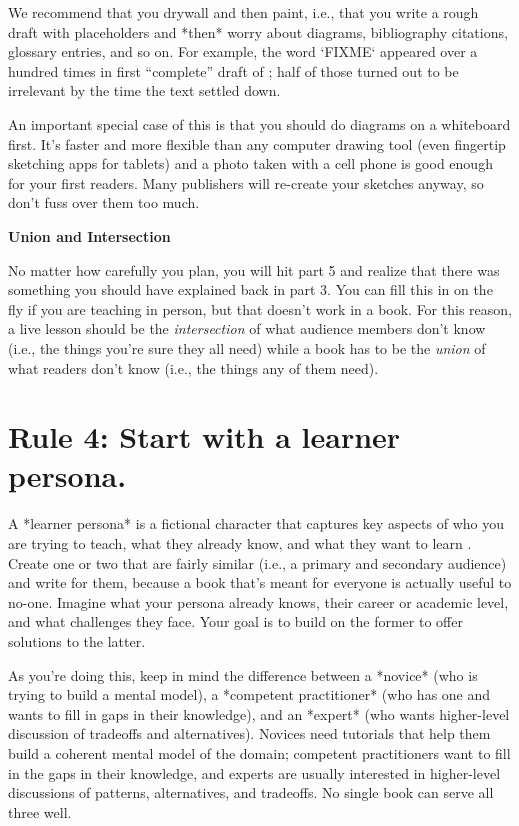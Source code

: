\documentclass[10pt,letterpaper]{article}
\begin{document}
We recommend that you drywall and then paint,
i.e.,
that you write a rough draft with placeholders
and *then* worry about diagrams, bibliography citations, glossary entries, and so on.
For example,
the word `FIXME` appeared over a hundred times in first ``complete'' draft of \cite{Wi2019};
half of those turned out to be irrelevant by the time the text settled down.

An important special case of this is that you should do diagrams on a whiteboard first.
It's faster and more flexible than any computer drawing tool
(even fingertip sketching apps for tablets)
and a photo taken with a cell phone is good enough for your first readers.
Many publishers will re-create your sketches anyway,
so don't fuss over them too much.

\begin{mdframed}
\textbf{Union and Intersection}

\noindent
No matter how carefully you plan,
you will hit part 5 and realize that
there was something you should have explained back in part 3.
You can fill this in on the fly if you are teaching in person,
but that doesn't work in a book.
For this reason,
a live lesson should be the \emph{intersection} of what audience members don't know
(i.e., the things you're sure they all need)
while a book has to be the \emph{union} of what readers don't know
(i.e., the things any of them need).
\end{mdframed}

\section*{Rule 4: Start with a learner persona.}

A *learner persona* is a fictional character that captures key aspects of
who you are trying to teach,
what they already know,
and what they want to learn \cite{Wi2019}.
Create one or two that are fairly similar (i.e., a primary and secondary audience) and write for them,
because a book that's meant for everyone is actually useful to no-one.
Imagine what your persona already knows,
their career or academic level,
and what challenges they face.
Your goal is to build on the former to offer solutions to the latter. 

As you're doing this,
keep in mind the difference between a *novice* (who is trying to build a mental model),
a *competent practitioner* (who has one and wants to fill in gaps in their knowledge),
and an *expert* (who wants higher-level discussion of tradeoffs and alternatives).
Novices need tutorials that help them build a coherent mental model of the domain;
competent practitioners want to fill in the gaps in their knowledge,
and experts are usually interested in higher-level discussions of patterns, alternatives, and tradeoffs.
No single book can serve all three well.
\end{document}
